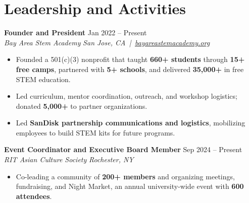 \documentclass[10pt,letterpaper]{article}
\newif\ifresumeFirstRole
\newcommand{\resumeRole}[4]{%
  \ifresumeFirstRole
    \global\resumeFirstRolefalse
  \else
    \vspace{0pt plus 1fill}%
  \fi
  \textbf{#1} \hfill #2\\
  \textit{#3} \hfill \textit{#4}
}
\begin{document}
\section*{Leadership and Activities}
\resumeRole{Founder and President}{Jan 2022 -- Present}{Bay Area Stem Academy}{San Jose, CA \,|\, \href{https://bayareastemacademy.org}{bayareastemacademy.org}}
\begin{itemize}
  \item Founded a 501(c)(3) nonprofit that taught \textbf{660+ students} through \textbf{15+ free camps}, partnered with \textbf{5+ schools}, and delivered \textbf{\textdollar{}35,000+} in free STEM education.
  \item Led curriculum, mentor coordination, outreach, and workshop logistics; donated \textbf{\textdollar{}5,000+} to partner organizations.
  \item Led \textbf{SanDisk partnership communications and logistics}, mobilizing employees to build STEM kits for future programs.
\end{itemize}

\resumeRole{Event Coordinator and Executive Board Member}{Sep 2024 -- Present}{RIT Asian Culture Society}{Rochester, NY}
\begin{itemize}
  \item Co-leading a community of \textbf{200+ members} and organizing meetings, fundraising, and Night Market, an annual university-wide event with \textbf{600 attendees}.
\end{itemize}
\end{document}
